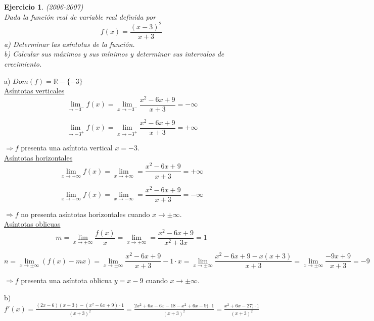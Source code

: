 \documentclass[12pt, a4paper]{amsart}
\newtheorem{ejer}{Ejercicio}
\newcommand{\s}{\color[rgb]{0,0,0.5}}
\begin{document}
\begin{ejer}\em (2006-2007)\\
Dada la función real de variable real definida por
$$
f(x)=\frac{(x-3)^2}{x+3}
$$
a) Determinar las asíntotas de la función.\\
b) Calcular sus máximos y sus mínimos y determinar sus intervalos de crecimiento.
\end{ejer}
\s
a) $Dom(f)=\mathbb{R}-\{-3\}$\\

\underline{Asíntotas verticales}\\

\[\lim_{\to -3^-}f(x)=\lim_{x\to -3^-}\frac{x^2-6x+9}{x+3}=-\infty\]

\[\lim_{\to -3^+}f(x)=\lim_{x\to -3^+}\frac{x^2-6x+9}{x+3}=+\infty\]

\vspace*{5mm}

$\Rightarrow f$ presenta una asíntota vertical $x=-3.$\\

\underline{Asíntotas horizontales}\\

\[\lim_{x\to +\infty}f(x)=\lim_{x\to +\infty}=\frac{x^2-6x+9}{x+3}=+\infty\]

\[\lim_{x\to -\infty}f(x)=\lim_{x\to -\infty}=\frac{x^2-6x+9}{x+3}=-\infty\]

\vspace*{5mm}

$\Rightarrow f$ no presenta asíntotas horizontales cuando $x\to \pm \infty.$\\

\underline{Asíntotas oblicuas}\\

\[m=\lim_{x\to \pm \infty} \frac{f(x)}{x}=\lim_{x\to \pm\infty}=\frac{x^2-6x+9}{x^2+3x}=1\]

\[n=\lim_{x\to \pm \infty} (f(x)-mx)=\lim_{x\to \pm \infty} \frac{x^2-6x+9}{x+3}-1\cdot x=\lim_{x\to \pm \infty} \frac{x^2-6x+9-x(x+3)}{x+3}=\lim_{x\to \pm \infty} \frac{-9x+9}{x+3}=-9\]

\vspace*{5mm}

$\Rightarrow f$ presenta una asíntota oblicua $y=x-9$ cuando $x\to \pm \infty.$

\vspace*{1cm}

b) $f'(x)=\frac{(2x-6)(x+3)-(x^2-6x+9)\cdot 1}{(x+3)^2}=\frac{2x^2+6x-6x-18-x^2+6x-9)\cdot 1}{(x+3)^2}=\frac{x^2+6x-27)\cdot 1}{(x+3)^2}$\\
\end{document}
